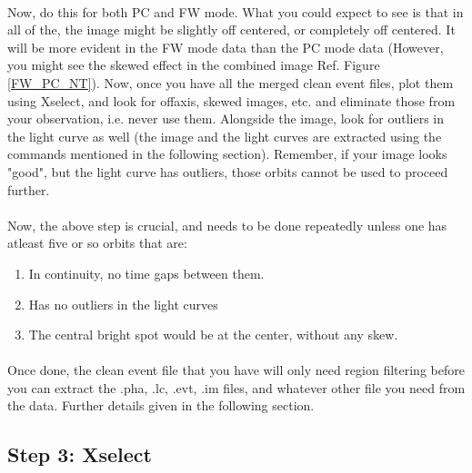 \documentclass[a4paper,twoside]{report}
\numberwithin{equation}{section}
\begin{document}
\paragraph{}
Now, do this for both PC and FW mode. What you could expect to see is that in all of the, the image might be slightly off centered, or completely off centered. It will be more evident in the FW mode data than the PC mode data (However, you might see the skewed effect in the combined image Ref. Figure \ref{FW_PC_NT}). Now, once you have all the merged clean event files, plot them using Xselect, and look for offaxis, skewed images, etc. and eliminate those from your observation, i.e. never use them. Alongside the image, look for outliers in the light curve as well (the image and the light curves are extracted using the commands mentioned in the following section). Remember, if your image looks "good", but the light curve has outliers, those orbits cannot be used to proceed further. 
\paragraph{}
Now, the above step is crucial, and needs to be done repeatedly unless one has atleast five or so orbits that are: 
\begin{enumerate}
\item In continuity, no time gaps between them.
\item Has no outliers in the light curves
\item The central bright spot would be at the center, without any skew.
\end{enumerate}
\paragraph{}
Once done, the clean event file that you have will only need region filtering before you can extract the .pha, .lc, .evt, .im files, and whatever other file you need from the data. Further details given in the following section. 
\newpage
\subsection{Step 3: Xselect}
\end{document}
